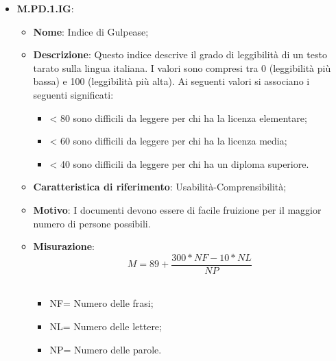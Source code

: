 \documentclass[10pt, a4paper]{article}
\begin{document}
\begin{itemize}
     \item \textbf{M.PD.1.IG}:
    \begin{itemize}
        \item \textbf{Nome}: Indice di Gulpease;
        \item \textbf{Descrizione}: Questo indice descrive il grado di leggibilità di un testo tarato sulla lingua italiana. I valori sono compresi tra 0 (leggibilità più bassa) e 100 (leggibilità più alta). Ai seguenti valori si associano i seguenti significati:
        \begin{itemize}
            \item < 80 sono difficili da leggere per chi ha la licenza elementare;
            \item < 60 sono difficili da leggere per chi ha la licenza media;
            \item < 40 sono difficili da leggere per chi ha un diploma superiore.
        \end{itemize}
        \item \textbf{Caratteristica di riferimento}: Usabilità-Comprensibilità;
        \item \textbf{Motivo}: I documenti devono essere di facile fruizione per il maggior numero di persone possibili.
        \item \textbf{Misurazione}: \[M=89 + \frac{300* NF -10* NL}{NP} \] \\
        \begin{itemize}
        \item NF= Numero delle frasi;
        \item NL= Numero delle lettere;
        \item NP= Numero delle parole.\\
        \end{itemize}
        \end{itemize}
        \begin{comment}
       \item Per lo scopo dei documenti e per la formalità
richiesta da essi, capiterà spesso che vengano impiegati termini tecnici che non si possono
sostituire. Anche interrompere la frase a favore di un indice più alto potrebbe spezzarne il
ragionamento o, peggio, storpiarne il contenuto. Infine, usare frasi troppo dirette potrebbe
risultare poco professionale ai fini del documento. Perciò, i documenti saranno valutati da
un essere umano per stabilire se e come il testo potrebbe essere semplificato. I limiti imposti
da tale indice saranno sufficientemente rilassati per accettare frasi un po’ più articolate.
Per migliorare l’utilizzo di questo indice non verrà controllato solamente a livello
\end{comment}



\end{itemize}
\end{document}
